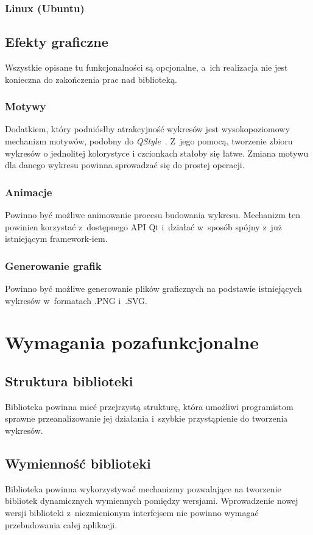 \documentclass[11pt,twoside,a4paper,final]{article}
\begin{document}
\subsubsection{Linux (Ubuntu)}

\subsection{Efekty graficzne}
Wszystkie opisane tu funkcjonalności są opcjonalne, a~ich realizacja nie jest konieczna do zakończenia prac nad biblioteką.

\subsubsection{Motywy}
Dodatkiem, który podniósłby atrakcyjność wykresów jest wysokopoziomowy mechanizm motywów, podobny do \textit{QStyle}~\cite{qstyle}. Z~jego pomocą, tworzenie zbioru wykresów o jednolitej kolorystyce i czcionkach stałoby się łatwe. Zmiana motywu dla danego wykresu powinna sprowadzać się do prostej operacji.

\subsubsection{Animacje}
Powinno być możliwe animowanie procesu budowania wykresu. Mechanizm ten powinien korzystać z~dostępnego API Qt\cite{qt-anim} i~działać w~sposób spójny z~już istniejącym framework-iem.

\subsubsection{Generowanie grafik}
Powinno być możliwe generowanie plików graficznych na podstawie istniejących wykresów w~formatach .PNG i~.SVG.



\section{Wymagania pozafunkcjonalne}


\subsection{Struktura biblioteki}
Biblioteka powinna mieć przejrzystą strukturę, która umożliwi programistom sprawne przeanalizowanie jej działania i~szybkie przystąpienie do tworzenia wykresów.

\subsection{Wymienność biblioteki}
Biblioteka powinna wykorzystywać mechanizmy pozwalające na tworzenie bibliotek dynamicznych wymiennych pomiędzy wersjami. Wprowadzenie nowej wersji biblioteki z~niezmienionym interfejsem nie powinno wymagać przebudowania całej aplikacji.
\end{document}
